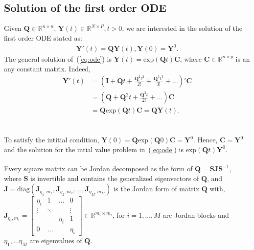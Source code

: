 \subsection{Solution of the first order ODE}
\label{secapp:first-order-ode}
Given $\bm{Q} \in \mathbb{R}^{n \times n}$, $\bm{Y}(t) \in \mathbb{R}^{N \times P}, t > 0$, we are interested in the solution of the first order ODE stated as:
\begin{align}
\label{eq:ode}
    \bm{Y}'(t) = \bm{Q}\bm{Y}(t), \bm{Y}(0) = \bm{Y}^0.
\end{align}
The general solution of~(\ref{eq:ode}) is $\bm{Y}(t) = \mathrm{exp}(\bm{Q}t)\bm{C}$, where $\bm{C} \in \mathbb{R}^{n \times p}$ is an any constant matrix. Indeed, 
\begin{equation}
    \begin{aligned}
        \bm{Y}'(t) &= (\bm{I} + \bm{Q}t + \frac{\bm{Q}^2t^2}{2!} + \frac{\bm{Q}^3t^3}{3!} + \dots)'\bm{C}\\
        &= (\bm{Q} + \bm{Q}^2t + \frac{\bm{Q}^3t}{2!} + \dots)\bm{C}\\
        & = \bm{Q}\mathrm{exp}(\bm{Q}t)\bm{C} = \bm{Q}\bm{Y}(t).
    \end{aligned}
\end{equation}\\\\
To satisfy the intitial condition, $\bm{Y}(0) = \bm{Q}\mathrm{exp}(\bm{Q}0)\bm{C} = \bm{Y}^0$. Hence, $\bm{C} = \bm{Y}^0$ and the solution for the intial value problem in~(\ref{eq:ode}) is $\mathrm{exp}(\bm{Q}t)\bm{Y}^0$.
\\  \\
Every square matrix can be Jordan decomposed as the form of $\bm{Q} = \bm{S}\bm{J}\bm{S}^{-1}$, where $\bm{S}$ is invertible and contains the generalized eigenvectors of $\bm{Q}$, and $\bm{J} = \bm{\mathrm{diag}}(\bm{J}_{\eta_1, m_1}, \bm{J}_{\eta_2, m_2}, \dots, \bm{J}_{\eta_M, m_M}) $ is the Jordan form of matrix $\bm{Q}$ with,\\
$\bm{J}_{\eta_i, m_i} = \begin{bmatrix} 
    \eta_i &  1& \dots &0\\
   \vdots & \ddots & & \vdots\\
    &  & \eta_i& 1\\
    0 & \dots    &   & \eta_i
    \end{bmatrix} \in \mathbb{R}^{m_i \times m_i}$, for $i = 1, \dots, M$ are Jordan blocks and $\eta_1, \dots \eta_M$ are eigenvalues of $\bm{Q}$.
\\
